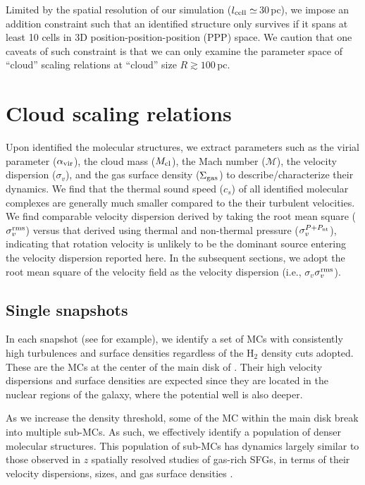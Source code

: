\documentclass[apj]{emulateapj} %
\begin{document}
Limited by the spatial resolution of our simulation ($l_{\rm cell}\simeq$\,30\,pc), we impose an addition constraint such that an identified structure only survives if it spans at least 10 cells in 3D position-position-position (PPP) space. We caution that one caveats of such constraint is that we can only examine the parameter space of ``cloud'' scaling relations at ``cloud'' size $R\gtrsim100$\,pc. 


\section{Cloud scaling relations} \label{sec:results}
Upon identified the molecular structures, we extract parameters such as
the virial parameter ($\alpha_{\rm vir}$), 
the cloud mass ($M_{\rm cl}$), 
the Mach number ($\mathcal{M}$), 
the velocity dispersion ($\sigma_v$), and the 
gas surface density ($\Sigma_{\rm gas}$)
to describe/characterize their dynamics.
We find that the thermal sound speed ($c_s$) 
of all identified molecular complexes are generally much smaller compared to the their
turbulent velocities.
We find comparable velocity dispersion derived by taking the root mean square ($\sigma_v^{\rm rms}$) versus
that derived using thermal and non-thermal pressure ($\sigma_v^{P+P_{\rm nt}}$), indicating that 
rotation velocity is unlikely to be the dominant source entering the velocity dispersion reported here.
In the subsequent sections, we adopt the root mean square of the velocity field
as the velocity dispersion (i.e., $\sigma_v$\eq$\sigma_v^{\rm rms}$).

\subsection{Single snapshots}  \label{sec:singless}
In each snapshot (see  for example), 
we identify a set of MCs with consistently high turbulences and surface densities 
regardless of the H$_2$ density cuts adopted. 
These are the MCs at the center of the main disk of \flower.
Their high velocity dispersions and surface densities are expected since 
they are located in the nuclear regions of the 
galaxy, where the potential well is also deeper.

As we increase the density threshold, some of the MC within the main disk break 
into multiple sub-MCs.
As such, we effectively identify a population of denser molecular structures. 
This population of sub-MCs has dynamics largely
similar to those observed 
in $z$ spatially resolved studies of gas-rich SFGs, in
terms of their velocity dispersions, sizes, and gas surface densities \citep[e.g.,][]{Swinbank11a}.
\end{document}
